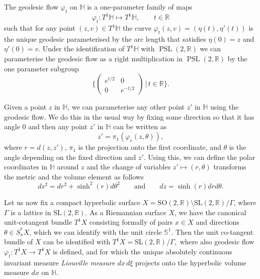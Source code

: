 \documentclass[11pt,twoside,reqno]{amsart}
\newcommand{\R}{\mathbb{R}}
\newcommand{\bH}{\mathbb{H}}
\renewcommand{\S}{\mathbb{S}}
\renewcommand{\phi}{\varphi}
\newcommand{\1}{\mathrm{\mathbf{1}}}
\DeclareMathOperator{\PSL}{PSL}
\numberwithin{equation}{section}
\theoremstyle{plain}
\theoremstyle{definition}
\theoremstyle{remark}
\begin{document}
The geodesic flow $\varphi_t$ on $\mathbb{H}$ is a one-parameter family of maps
\begin{equation*}
    \varphi_t : T^{1}\bH \mapsto T^{1}\bH, \qquad t\in\R
\end{equation*}
such that for any point $(z,v)\in T^1\bH$ the curve $\varphi_t(z,v) = (\eta(t),\eta'(t))$ is the unique geodesic parameterised by the arc length that satisfies $\eta(0)=z$ and $\eta'(0) =v$. Under the identification of $T^{1}\bH$ with $\PSL(2,\R)$ we can parameterise the geodesic flow as a right multiplication in $\PSL(2,\R)$  by the one parameter subgroup 
\begin{equation*}
    \Bigg\{ \begin{pmatrix}
        e^{t/2} &0 \\ 0 &e^{-t/2}
    \end{pmatrix} \,\Bigg| \, t\in\R \Bigg\}.    
\end{equation*}

Given a point $z$ in $\bH$, we can parameterise any other point $z'$ in $\bH$ using the geodesic flow. We do this in the usual way by fixing some direction so that it has angle 0 and then any point $z'$ in $\bH$ can be written as
\begin{equation*}
    z' = \pi_1(\varphi_r(z,\theta)),
\end{equation*}
where $r = d(z,z')$, $\pi_1$ is the projection onto the first coordinate, and $\theta$ is the angle depending on the fixed direction and $z'$. Using this, we can define the polar coordinates in $\bH$ around $z$ and the change of variables $z'\mapsto (r,\theta)$ transforms the metric and the volume element as follows
\begin{equation*}
    ds^2 = dr^2 +\sinh^2(r) d \theta^2 \qquad\text{and}\qquad dz = \sinh(r) dr d\theta.
\end{equation*}

Let us now fix a compact hyperbolic surface $X = \mathrm{SO}(2,\R) \setminus \mathrm{SL}(2,\R)/\Gamma $, where $\Gamma$ is a lattice in $\mathrm{SL}(2,\R)$. As a Riemannian surface $X$, we have the canonical unit-cotangent bundle $T^1 X$ consisting formally of pairs $x \in X$ and directions $\theta \in S_x^* X$, which we can identify with the unit circle $\S^1$. Then the unit co-tangent bundle of $X$ can be identified with $T^1 X = \mathrm{SL}(2,\R)/\Gamma,$ where also geodesic flow $\phi_t : T^1 X \to T^1 X$ is defined, and for which the unique absolutely continuous invariant measure \textit{Liouville measure} $dx \, d\xi$ projects onto the hyperbolic volume measure $dx$ on $\mathbb{H}$.
\end{document}
